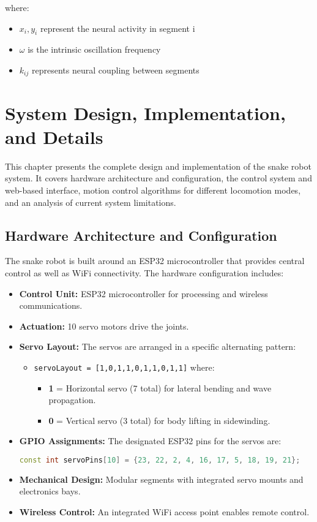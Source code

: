 \documentclass[12pt,a4paper]{report}
\begin{document}
where:
\begin{itemize}
    \item $x_i, y_i$ represent the neural activity in segment i
    \item $\omega$ is the intrinsic oscillation frequency
    \item $k_{ij}$ represents neural coupling between segments
\end{itemize}
\chapter{System Design, Implementation, and Details}

This chapter presents the complete design and implementation of the snake robot system. It covers hardware architecture and configuration, the control system and web-based interface, motion control algorithms for different locomotion modes, and an analysis of current system limitations.

\section{Hardware Architecture and Configuration}
The snake robot is built around an ESP32 microcontroller that provides central control as well as WiFi connectivity. The hardware configuration includes:

\begin{itemize}
    \item \textbf{Control Unit:} ESP32 microcontroller for processing and wireless communications.
    \item \textbf{Actuation:} 10 servo motors drive the joints.
    \item \textbf{Servo Layout:} The servos are arranged in a specific alternating pattern:
    \begin{itemize}
        \item \texttt{servoLayout = [1,0,1,1,0,1,1,0,1,1]} where:
            \begin{itemize}
                \item \textbf{1} = Horizontal servo (7 total) for lateral bending and wave propagation.
                \item \textbf{0} = Vertical servo (3 total) for body lifting in sidewinding.
            \end{itemize}
    \end{itemize}
    \item \textbf{GPIO Assignments:} The designated ESP32 pins for the servos are:
    \begin{lstlisting}[language=C++]
const int servoPins[10] = {23, 22, 2, 4, 16, 17, 5, 18, 19, 21};
    \end{lstlisting}
    \item \textbf{Mechanical Design:} Modular segments with integrated servo mounts and electronics bays.
    \item \textbf{Wireless Control:} An integrated WiFi access point enables remote control.
\end{itemize}
\end{document}
